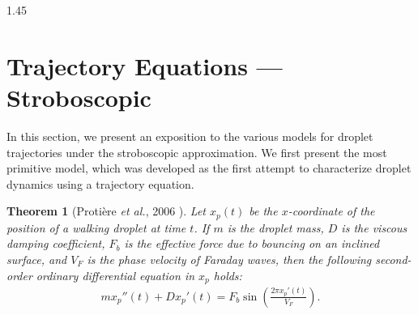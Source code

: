 \documentclass[12pt,titlepage]{article}
\newtheorem{theorem}{Theorem}[section] %
\theoremstyle{definition}
\theoremstyle{remark}
\begin{document}
\begin{spacing}{1.45}
\pagestyle{empty}
%




%

\appendix
\gdef\thesection{Appendix \Alph{section}}

\iffalse
\section{Trajectory Equations --- Stroboscopic}

In this section, we present an exposition to the various models for droplet trajectories under the stroboscopic approximation. We first present the most primitive model, which was developed as the first attempt to characterize droplet dynamics using a trajectory equation.

\begin{theorem}[Protière \textit{et al.}, 2006 \cite{protiere2006particle}]
Let $x_p(t)$ be the $x$-coordinate of the position of a walking droplet at time $t$. If $m$ is the droplet mass, $D$ is the \textit{viscous damping coefficient}, $F_b$ is the effective force due to bouncing on an inclined surface, and $V_F$ is the phase velocity of Faraday waves, then the following second-order ordinary differential equation in $x_p$ holds:
\begin{align}
\label{prot}
    mx_p''(t) + Dx_p'(t) = F_b \sin\left(\frac{2 \pi x_p' (t)}{V_F}\right).
\end{align}
\end{theorem}


\end{spacing}
\end{document}
